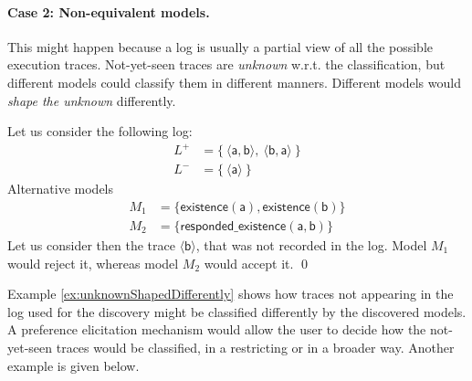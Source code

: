 \paragraph{Case 2: Non-equivalent models.}
This might happen because a log is usually a partial view of all the possible execution traces. Not-yet-seen traces are \emph{unknown} w.r.t. the classification, but different models could classify them in different manners. Different models would \emph{shape the unknown} differently.

\begin{example}
\label{ex:unknownShapedDifferently}
Let us consider the following log:
\begin{align*}
L^+ & = \{\ \langle \mathsf{a}, \mathsf{b} \rangle,\ \langle \mathsf{b}, \mathsf{a} \rangle \ \} \\
L^- & = \{\ \langle \mathsf{a} \rangle \ \}
\end{align*}
%
Alternative models 
\begin{align*}
M_1 & = \{ \mathsf{existence(a),existence(b)}\} \\
M_2 & = \{ \mathsf{responded\_existence(a, b)}\}
\end{align*}
%
Let us consider then the trace $\langle \mathsf{b} \rangle$, that was not recorded in the log. Model $M_1$ %
would reject it, whereas model $M_2$ %
would accept it.
\qed
\end{example}

Example \ref{ex:unknownShapedDifferently} shows how traces not appearing in the log used for the discovery might be classified differently by the discovered models. A preference elicitation mechanism would allow the user to decide how the not-yet-seen traces would be classified, in a restricting or in a broader way. Another example is given below.

